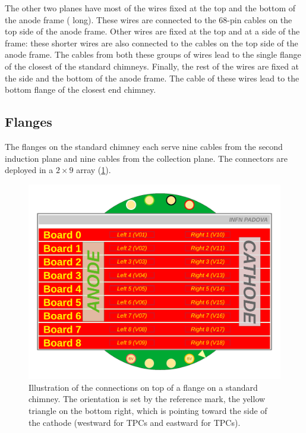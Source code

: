 The other two planes have most of the wires fixed at the top and the bottom of the anode frame
( long).
These wires are connected to the 68-pin cables on the top side of the anode frame.
Other wires are fixed at the top and at a side of the frame:
these shorter wires are also connected to the cables on the top side of the anode frame.
The cables from both these groups of wires lead to the single flange of the closest of the standard chimneys.
Finally, the rest of the wires are fixed at the side and the bottom of the anode frame.
The cable of these wires lead to the bottom flange of the closest end chimney.


\subsection{Flanges}

The flanges on the standard chimney each serve nine cables from the second induction plane
and nine cables from the collection plane.
The connectors are deployed in a $2 \times 9$ array (\cref{fig:FlangeConnections}).

\begin{figure}
  \includegraphics[width=\textwidth]{figures/TopFlangesAndMinicrate}
  \caption{
    Illustration of the connections on top of a flange on a standard chimney.
    The orientation is set by the reference mark,
    the yellow triangle on the bottom right,
    which is pointing toward the side of the cathode
    (\ie westward for  TPCs and eastward for  TPCs).
    \label{fig:FlangeConnections}
  }
\end{figure}

